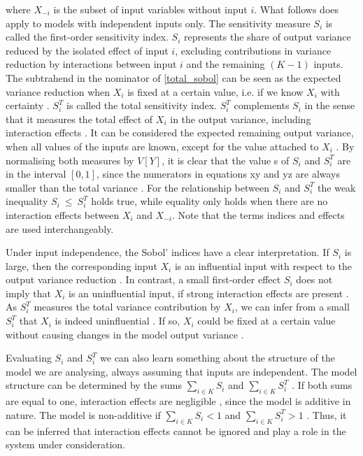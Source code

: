 \noindent where $X_{- i}$ is the subset of input variables without input $i$. What follows does apply to models with independent inputs only. The sensitivity measure $S_i$ is called the first-order sensitivity index. $S_i$ represents the share of output variance reduced by the isolated effect of input $i$, excluding contributions in variance reduction by interactions between input $i$ and the remaining $(K-1)$ inputs. The subtrahend in the nominator of \cref{total_sobol} can be seen as the expected variance reduction when $X_i$ is fixed at a certain value, i.e. if we know $X_i$ with certainty \citep{SNS16}. $S_i^T$ is called the total sensitivity index. $S_i^T$ complements $S_i$ in the sense that it measures the total effect of $X_i$ in the output variance, including interaction effects \citep{SNS16}. It can be considered the expected remaining output variance, when all values of the inputs are known, except for the value attached to $X_i$ \citep{SNS16}. By normalising both measures by $V[Y]$, it is clear that the value s of $S_i$ and $S_i^T$ are in the interval $[0, 1]$, since the numerators in equations xy and yz are always smaller than the total variance \citep{GM17}. For the relationship between $S_i$ and $S_i^T$ the weak inequality $S_i\ \le\ S_i^T$ holds true, while equality only holds when there are no interaction effects between $X_i$ and $X_{- i}$. Note that the terms indices and effects are used interchangeably.

Under input independence, the Sobol' indices have a clear interpretation. If $S_i$ is large, then the corresponding input $X_i$ is an influential input with respect to the output variance reduction \citep{GM17}. In contrast, a small first-order effect $S_i$ does not imply that $X_i$ is an uninfluential input, if strong interaction effects are present \citep{GM17}. As $S_i^T$ measures the total variance contribution by $X_i$, we can infer from a small $S_i^T$ that $X_i$ is indeed uninfluential \citep{GM17}. If so, $X_i$ could be fixed at a certain value without causing changes in the model output variance \citep{GM17}.

Evaluating $S_i$ and $S_i^T$ we can also learn something about the structure of the model we are analysing, always assuming that inputs are independent. The model structure can be determined by the sums $\sum_{i \in K} S_i$ and $\sum_{i \in K} S_i^T$ \citep{GM17}. If both sums are equal to one, interaction effects are negligible , since the model is additive in nature. The model is non-additive if $\sum_{i \in K} S_i < 1$ and $\sum_{i \in K} S_i^T > 1$ \citep{GM17}. Thus, it can be inferred that interaction effects cannot be ignored and play a role in the system under consideration.

